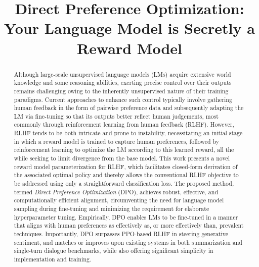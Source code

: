 \title{Direct Preference Optimization: Your Language Model is Secretly a Reward Model}

\begin{abstract}
Although large-scale unsupervised language models (LMs) acquire extensive world knowledge and some reasoning abilities, exerting precise control over their outputs remains challenging owing to the inherently unsupervised nature of their training paradigms. Current approaches to enhance such control typically involve gathering human feedback in the form of pairwise preference data and subsequently adapting the LM via fine-tuning so that its outputs better reflect human judgements, most commonly through reinforcement learning from human feedback (RLHF). However, RLHF tends to be both intricate and prone to instability, necessitating an initial stage in which a reward model is trained to capture human preferences, followed by reinforcement learning to optimize the LM according to this learned reward, all the while seeking to limit divergence from the base model. This work presents a novel reward model parameterization for RLHF, which facilitates closed-form derivation of the associated optimal policy and thereby allows the conventional RLHF objective to be addressed using only a straightforward classification loss. The proposed method, termed \textit{Direct Preference Optimization} (DPO), achieves robust, effective, and computationally efficient alignment, circumventing the need for language model sampling during fine-tuning and minimizing the requirement for elaborate hyperparameter tuning. Empirically, DPO enables LMs to be fine-tuned in a manner that aligns with human preferences as effectively as, or more effectively than, prevalent techniques. Importantly, DPO surpasses PPO-based RLHF in steering generative sentiment, and matches or improves upon existing systems in both summarization and single-turn dialogue benchmarks, while also offering significant simplicity in implementation and training.
\end{abstract}

